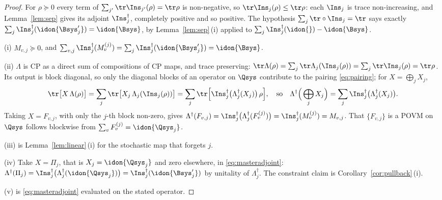 \begin{proof}
For $\rho\succeq0$ every term of $\sum_{j'}\tr\Ins_{j'}(\rho)=\tr\rho$ is
non-negative, so $\tr\Ins_j(\rho)\le\tr\rho$: each $\Ins_j$ is trace
non-increasing, and Lemma~\ref{lem:sep} gives its adjoint $\Ins_j^{\dagger}$,
completely positive and so positive. The hypothesis
$\sum_j\tr\circ\Ins_j=\tr$ says exactly
$\sum_j\Ins_j^{\dagger}(\idon{\Bsys'_j})=\idon{\Bsys}$, by
Lemma~\ref{lem:sep}\,(i) applied to
$\sum_j\Ins_j^{\dagger}(\idon{})-\idon{\Bsys}$.

(i) $M_{v,j}\succeq0$, and
$\sum_{v,j}\Ins_j^{\dagger}(M^{(j)}_v)
=\sum_j\Ins_j^{\dagger}(\idon{\Bsys'_j})=\idon{\Bsys}$.

(ii) $\Lambda$ is CP as a direct sum of compositions of CP maps, and trace
preserving: $\tr\Lambda(\rho)=\sum_j\tr\Lambda_j(\Ins_j(\rho))
=\sum_j\tr\Ins_j(\rho)=\tr\rho$. Its output is block diagonal, so only the
diagonal blocks of an operator on $\Qsys$ contribute to the pairing
\eqref{eq:pairing}; for $X=\bigoplus_jX_j$,
\begin{equation}\label{eq:masteradjoint}
  \tr\big[X\,\Lambda(\rho)\big]
  =\sum_j\tr\big[X_j\,\Lambda_j(\Ins_j(\rho))\big]
  =\sum_j\tr\Big[\Ins_j^{\dagger}\big(\Lambda_j^{\dagger}(X_j)\big)\,\rho\Big],
  \quad\text{so}\quad
  \Lambda^{\dagger}\Big(\bigoplus_jX_j\Big)
  =\sum_j\Ins_j^{\dagger}\big(\Lambda_j^{\dagger}(X_j)\big).
\end{equation}
Taking $X=F_{v,j}$, with only the $j$-th block non-zero, gives
$\Lambda^{\dagger}(F_{v,j})=\Ins_j^{\dagger}\big(\Lambda_j^{\dagger}
(F^{(j)}_v)\big)=\Ins_j^{\dagger}(M^{(j)}_v)=M_{v,j}$. That
$\{F_{v,j}\}$ is a POVM on $\Qsys$ follows blockwise from
$\sum_vF^{(j)}_v=\idon{\Qsys_j}$.

(iii) is Lemma~\ref{lem:linear}\,(i) for the stochastic map that forgets $j$.

(iv) Take $X=\Pi_j$, that is $X_j=\idon{\Qsys_j}$ and zero elsewhere, in
\eqref{eq:masteradjoint}: $\Lambda^{\dagger}(\Pi_j)
=\Ins_j^{\dagger}\big(\Lambda_j^{\dagger}(\idon{\Qsys_j})\big)
=\Ins_j^{\dagger}(\idon{\Bsys'_j})$ by unitality of $\Lambda_j^{\dagger}$. The
constraint claim is Corollary~\ref{cor:pullback}\,(i).

(v) is \eqref{eq:masteradjoint} evaluated on the stated operator.
\end{proof}
